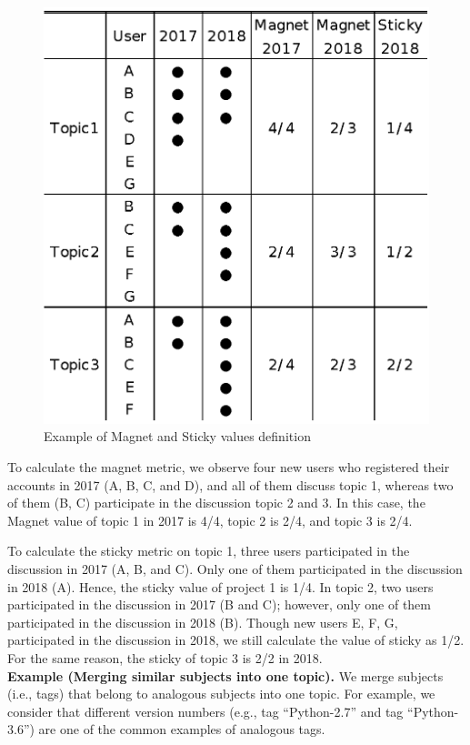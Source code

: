 \documentclass[english,preprint,JIP,technote]{ipsj}
\begin{document}
\begin{figure}[t]
 \centering
 \includegraphics[width=.75\hsize]{img/explainofMS.eps}  
 \caption{Example of Magnet and Sticky values definition} 
 \label{fig:example2} 
\end{figure}


To calculate the magnet metric, we observe four new users who registered their accounts in 2017 (A, B, C, and D), and all of them discuss topic 1, whereas two of them (B, C) participate in the discussion topic 2 and 3. In this case, the Magnet value of topic 1 in 2017 is 4/4, topic 2 is 2/4, and topic 3 is 2/4.

To calculate the sticky metric on topic 1, three users participated in the discussion in 2017 (A, B, and C). Only one of them participated in the discussion in 2018 (A). Hence, the sticky value of project 1 is 1/4. In topic 2, two users participated in the discussion in 2017 (B and C); however, only one of them participated in the discussion in 2018 (B). Though new users E, F, G, participated in the discussion in 2018, we still calculate the value of sticky as 1/2. For the same reason, the sticky of topic 3 is 2/2 in 2018.\\

\noindent
\textbf{Example (Merging similar subjects into one topic).}
We merge subjects (i.e., tags) that belong to analogous subjects into one topic. For example, we consider that different version numbers (e.g., tag ``Python-2.7'' and tag ``Python-3.6'') are one of the common examples of analogous tags. 
\end{document}
